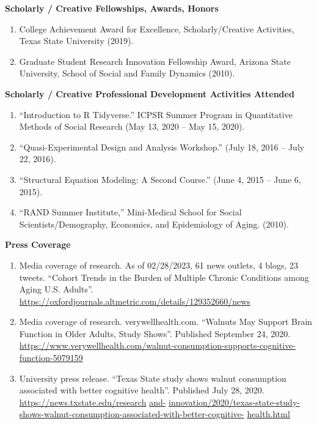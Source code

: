 \documentclass[
]{article}
\begin{document}
\textbf{Scholarly / Creative Fellowships, Awards, Honors}

\begin{enumerate}
\def\labelenumi{\arabic{enumi}.}
\item
  College Achievement Award for Excellence, Scholarly/Creative
  Activities, Texas State University (2019).
\item
  Graduate Student Research Innovation Fellowship Award, Arizona State
  University, School of Social and Family Dynamics (2010).
\end{enumerate}

\textbf{Scholarly / Creative Professional Development Activities
Attended}

\begin{enumerate}
\def\labelenumi{\arabic{enumi}.}
\item
  ``Introduction to R Tidyverse.'' ICPSR Summer Program in Quantitative
  Methods of Social Research (May 13, 2020 -- May 15, 2020).
\item
  ``Quasi-Experimental Design and Analysis Workshop.'' (July 18, 2016 --
  July 22, 2016).
\item
  ``Structural Equation Modeling: A Second Course.'' (June 4, 2015 --
  June 6, 2015).
\item
  ``RAND Summer Institute,'' Mini-Medical School for Social
  Scientists/Demography, Economics, and Epidemiology of Aging. (2010).
\end{enumerate}

\textbf{Press Coverage}

\begin{enumerate}
\def\labelenumi{\arabic{enumi}.}
\item
  Media coverage of research. As of 02/28/2023, 61 news outlets, 4
  blogs, 23 tweets. ``Cohort Trends in the Burden of Multiple Chronic
  Conditions among Aging U.S. Adults''.
  \url{https://oxfordjournals.altmetric.com/details/129352660/news}
\item
  Media coverage of research. verywellhealth.com. ``Walnuts May Support
  Brain Function in Older Adults, Study Shows''. Published September 24,
  2020.
  \url{https://www.verywellhealth.com/walnut-consumption-supports-cognitive-function-5079159}
\item
  University press release. ``Texas State study shows walnut consumption
  associated with better cognitive health''. Published July 28, 2020.
  \href{https://news.txstate.edu/research-and-innovation/2020/texas-state-study-shows-walnut-consumption-associated-with-better-cognitive-health.html}{https://news.txstate.edu/research}
  \href{https://news.txstate.edu/research-and-innovation/2020/texas-state-study-shows-walnut-consumption-associated-with-better-cognitive-health.html}{and-}
  \href{https://news.txstate.edu/research-and-innovation/2020/texas-state-study-shows-walnut-consumption-associated-with-better-cognitive-health.html}{innovation/2020/texas-state-study-shows-walnut-consumption-associated-with-better-cognitive-}
  \href{https://news.txstate.edu/research-and-innovation/2020/texas-state-study-shows-walnut-consumption-associated-with-better-cognitive-health.html}{health.html}
\end{enumerate}
\end{document}
